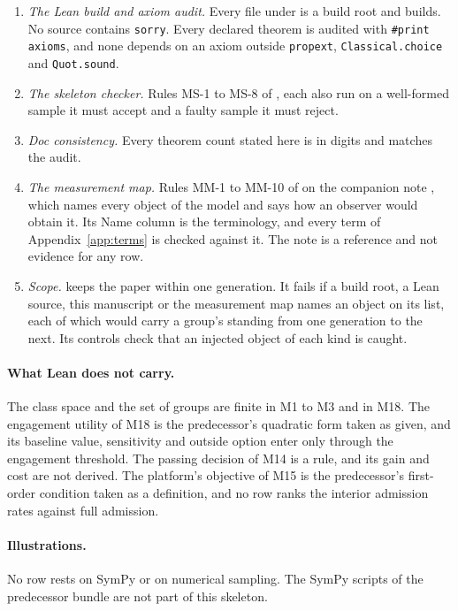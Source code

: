 \begin{enumerate}
\item \emph{The Lean build and axiom audit.} Every file under
 is a build root and builds. No source contains
\texttt{sorry}. Every declared theorem is audited with \texttt{\#print axioms},
and none depends on an axiom outside \texttt{propext},
\texttt{Classical.choice} and \texttt{Quot.sound}.
\item \emph{The skeleton checker.} Rules MS-1 to MS-8 of
, each also run on a well-formed sample it
must accept and a faulty sample it must reject.
\item \emph{Doc consistency.} Every theorem count stated here is in digits and
matches the audit.
\item \emph{The measurement map.} Rules MM-1 to MM-10 of
 on the companion note
, which names every object of the model and says
how an observer would obtain it. Its Name column is the terminology, and
every term of Appendix~\ref{app:terms} is checked against it. The note is a
reference and not evidence for any row.
\item \emph{Scope.}  keeps the paper within
one generation. It fails if a build root, a Lean source, this manuscript or
the measurement map names an object on its list, each of which would carry a
group's standing from one generation to the next. Its controls check that an
injected object of each kind is caught.
\end{enumerate}

\paragraph{What Lean does not carry.} The class space and the set of groups
are finite in M1 to M3 and in M18. The engagement utility of M18 is the
predecessor's quadratic form taken as given, and its baseline value,
sensitivity and outside option enter only through the engagement threshold.
The passing decision of M14 is a rule, and its gain and cost are not
derived. The platform's objective of M15 is the
predecessor's first-order condition taken as a definition, and no row ranks
the interior admission rates against full admission.

\paragraph{Illustrations.} No row rests on SymPy or on numerical sampling. The
SymPy scripts of the predecessor bundle are not part of this skeleton.


